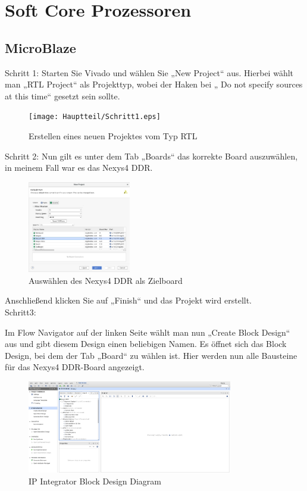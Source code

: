 
\chapter{Soft Core Prozessoren}\label{kap:softcoreprozessoren}
\newpage
\section{MicroBlaze}\label{kap:microblaze}

Schritt 1:
Starten Sie Vivado und wählen Sie „New Project“ aus.
Hierbei wählt man „RTL Project“ als Projekttyp, wobei der Haken bei „ Do not specify sources at this time“ gesetzt sein sollte.\\

\begin{figure}[H]
\centering
\texttt{[image: Hauptteil/Schritt1.eps]}
\caption{Erstellen eines neuen Projektes vom Typ RTL}
\label{fig:mbschritt1}
\end{figure}


Schritt 2:
Nun gilt es unter dem Tab „Boards“ das korrekte Board auszuwählen, in meinem Fall war es das Nexys4 DDR.


\begin{figure}[H]
\centering
\includegraphics[width=0.4\textwidth]{Hauptteil/schritt2.png}
\caption{Auswählen des Nexys4 DDR als Zielboard}
\label{fig:mbschritt2}
\end{figure}

Anschließend klicken Sie auf „Finish“ und das Projekt wird erstellt.\\

\newpage
Schritt3:

Im Flow Navigator  auf der linken Seite wählt man nun „Create Block Design“ aus und gibt diesem Design einen beliebigen Namen.
Es öffnet sich das Block Design, bei dem der Tab „Board“ zu wählen ist. Hier werden nun alle Bausteine für das Nexys4 DDR-Board angezeigt.\\

\begin{figure}[H]
\centering
\includegraphics[width=0.8\textwidth]{Hauptteil/schritt3.png}
\caption{IP Integrator Block Design Diagram}
\label{fig:mbschritt3}
\end{figure}

